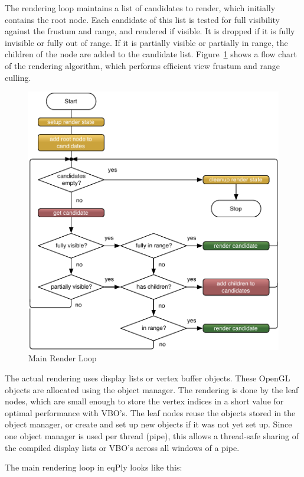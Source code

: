 \documentclass[10pt,a4]{scrartcl}
\newcommand{\fig}[1]{Figure~\ref{#1}}
\begin{document}
The rendering loop maintains a list of candidates to render, which
initially contains the root node. Each candidate of this list is tested
for full visibility against the frustum and range, and rendered if
visible. It is dropped if it is fully invisible or fully out of
range. If it is partially visible or partially in range, the children of
the node are added to the candidate list. \fig{fRender} shows a flow
chart of the rendering algorithm, which performs efficient view frustum
and range culling.

\begin{figure}
  \vspace{-2ex}\includegraphics[width=.618\textwidth]{images/render.pdf}
  {\caption{\small\label{fRender}Main Render Loop}}
\end{figure}
The actual rendering uses display lists or vertex buffer objects. These
OpenGL objects are allocated using the object manager. The rendering is
done by the leaf nodes, which are small enough to store the vertex
indices in a \textsf{short} value for optimal performance with VBO's.
The leaf nodes reuse the objects stored in the object manager, or create
and set up new objects if it was not yet set up. Since one object
manager is used per thread (pipe), this allows a thread-safe sharing of
the compiled display lists or VBO's across all windows of a pipe.

The main rendering loop in \textsf{eqPly} looks like this:
\end{document}
